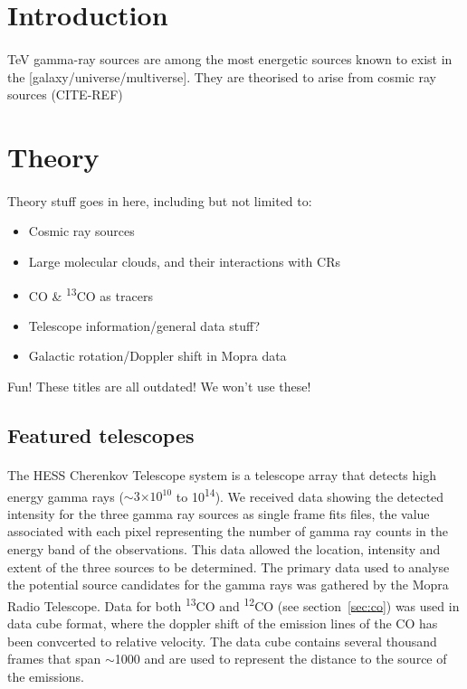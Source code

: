 \documentclass[a4paper, titlepage, oneside]{article}
\newcommand{\elem}[2]{\textsuperscript{#1}{#2}}
\newcommand{\e}[1]{\ensuremath{\times 10^{#1}}}
\begin{document}
\begin{multicols}{2}
\section{Introduction}
\paragraph{}
TeV gamma-ray sources are among the most energetic sources known to exist in the [galaxy/universe/multiverse]. They are theorised to arise from cosmic ray sources (CITE-REF)

\section{Theory}
\paragraph{}
Theory stuff goes in here, including but not limited to:
\begin{itemize}
  \item Cosmic ray sources
  \item Large molecular clouds, and their interactions with CRs
  \item CO \& \elem{13}{CO} as tracers
  \item Telescope information/general data stuff?
  \item Galactic rotation/Doppler shift in Mopra data
\end{itemize}
Fun! These titles are all outdated! We won't use these!

\subsection{Featured telescopes}
\paragraph{}

The HESS Cherenkov Telescope system is a telescope array that detects high energy gamma rays (\(\sim\)\(3\e{10}\) to \unit{10^{14}}{\electronvolt}). We received data showing the detected intensity for the three gamma ray sources as single frame fits files, the value associated with each pixel representing the number of gamma ray counts in the energy band of the observations. This data allowed the location, intensity and extent of the three sources to be determined. The primary data used to analyse the potential source candidates for the gamma rays was gathered by the Mopra Radio Telescope. Data for both \elem{13}{C}O and \elem{12}{C}O (see section~\ref{sec:co}) was used in data cube format, where the doppler shift of the emission lines of the CO has been convcerted to relative velocity. The data cube contains several thousand frames that span \(\sim\)\unit{1000}{\kilo\meter\cdot\reciprocal\second} and are used to represent the distance to the source of the emissions.


\end{multicols}
\end{document}
